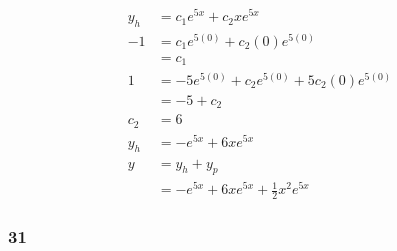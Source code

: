 \documentclass{article}
\begin{document}
\begin{align*}
  y_h & = c_1 e^{5x} + c_2 x e^{5x}                          \\
  -1  & = c_1 e^{5 (0)} + c_2 (0) e^{5 (0)}                  \\
      & = c_1                                                \\
  1   & = -5 e^{5 (0)} + c_2 e^{5 (0)} + 5 c_2 (0) e^{5 (0)} \\
      & = -5 + c_2                                           \\
  c_2 & = 6                                                  \\
  y_h & = -e^{5x} + 6 x e^{5x}                               \\
  y   & = y_h + y_p                                          \\
      & = -e^{5x} + 6 x e^{5x} + \frac{1}{2} x^2 e^{5x}
\end{align*}

\subsubsection{31}
\end{document}
